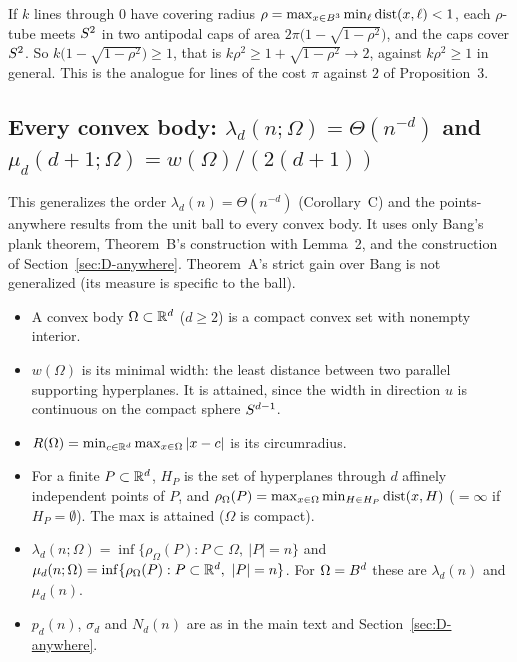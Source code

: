 \begin{remark}
If $k$ lines through $0$ have covering radius $\rho=\max_{x\in B^3}\min_\ell\operatorname{dist}(x,\ell)<1$, each $\rho$-tube meets $S^2$ in two antipodal
caps of area $2\pi\bigl(1-\sqrt{1-\rho^2}\bigr)$, and the caps cover $S^2$. So
$k\bigl(1-\sqrt{1-\rho^2}\bigr)\ge1$, that is $k\rho^2\ge1+\sqrt{1-\rho^2}\to2$, against $k\rho^2\ge1$
in general. This is the analogue for lines of the cost $\pi$ against $2$ of Proposition~3.
\end{remark}

\subsection{Every convex body: \texorpdfstring{$\lambda_d(n;\Omega)=\Theta(n^{-d})$}{lambda\_d(n;Omega) = Theta(n\textasciicircum -d)} and \texorpdfstring{$\mu_d(d+1;\Omega)=w(\Omega)/(2(d+1))$}{mu\_d(d+1;Omega) = w(Omega)/(2(d+1))}}
\label{sec:D-convex}

This generalizes the order $\lambda_d(n)=\Theta(n^{-d})$ (Corollary~C) and the points-anywhere results
from the unit ball to every convex body. It uses only Bang's plank theorem, Theorem~B's construction with
Lemma~2, and the construction of Section~\ref{sec:D-anywhere}. Theorem~A's strict gain over Bang is not
generalized (its measure is specific to the ball).

\begin{definition}\leavevmode
\begin{itemize}
  \item A convex body $\Omega\subset\mathbb{R}^d$ ($d\ge2$) is a compact convex set with nonempty interior.
  \item $w(\Omega)$ is its minimal width: the least distance between two parallel supporting hyperplanes. It
    is attained, since the width in direction $u$ is continuous on the compact sphere $S^{d-1}$.
  \item $R(\Omega)=\min_{c\in\mathbb{R}^d}\max_{x\in \Omega}\left|x-c\right|$ is its circumradius.
  \item For a finite $P\subset\mathbb{R}^d$, $H_P$ is the set of hyperplanes through $d$ affinely independent
    points of $P$, and $\rho_\Omega(P)=\max_{x\in \Omega}\min_{H\in H_P}\operatorname{dist}(x,H)$ ($=\infty$ if $H_P=\emptyset$).
    The max is attained ($\Omega$ is compact).
  \item $\lambda_d(n;\Omega)=\inf\{\rho_\Omega(P):P\subset \Omega,\ |P|=n\}$ and
    $\mu_d(n;\Omega)=\inf\{\rho_\Omega(P):P\subset\R^d,\ |P|=n\}$. For $\Omega=B^d$ these are $\lambda_d(n)$ and
    $\mu_d(n)$.
  \item $p_d(n)$, $\sigma_d$ and $N_d(n)$ are as in the main text and Section~\ref{sec:D-anywhere}.
\end{itemize}
\end{definition}

